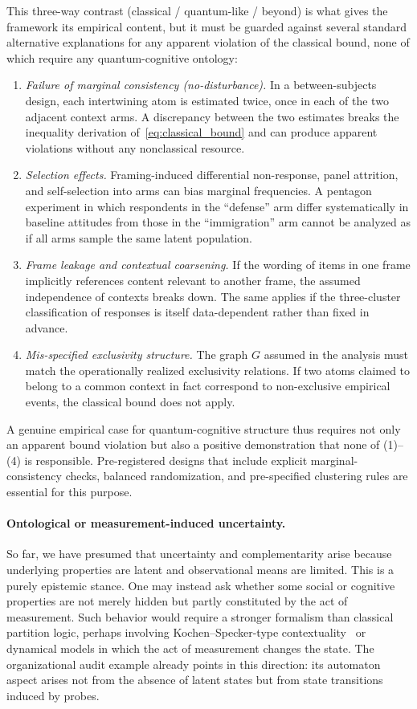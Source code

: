 \documentclass[aps,pra,twocolumn,superscriptaddress,floatfix,longbibliography]{revtex4-2}
\begin{document}
This three-way contrast (classical / quantum-like / beyond) is what
gives the framework its empirical content, but it must be guarded
against several standard alternative explanations for any apparent
violation of the classical bound, none of which require any
quantum-cognitive ontology:
\begin{enumerate}
\item \emph{Failure of marginal consistency (no-disturbance).}
In a between-subjects design, each intertwining atom is estimated
twice, once in each of the two adjacent context arms. A discrepancy
between the two estimates breaks the inequality derivation
of~\eqref{eq:classical_bound} and can produce apparent violations
without any nonclassical resource.
\item \emph{Selection effects.}
Framing-induced differential non-response, panel attrition, and
self-selection into arms can bias marginal frequencies. A pentagon
experiment in which respondents in the ``defense'' arm differ
systematically in baseline attitudes from those in the
``immigration'' arm cannot be analyzed as if all arms sample the
same latent population.
\item \emph{Frame leakage and contextual coarsening.}
If the wording of items in one frame implicitly references content
relevant to another frame, the assumed independence of contexts
breaks down. The same applies if the three-cluster classification of
responses is itself data-dependent rather than fixed in advance.
\item \emph{Mis-specified exclusivity structure.}
The graph $G$ assumed in the analysis must match the operationally
realized exclusivity relations. If two atoms claimed to belong to a
common context in fact correspond to non-exclusive empirical
events, the classical bound does not apply.
\end{enumerate}
A genuine empirical case for quantum-cognitive structure thus
requires not only an apparent bound violation but also a positive
demonstration that none of (1)--(4) is responsible. Pre-registered
designs that include explicit marginal-consistency checks, balanced
randomization, and pre-specified clustering rules are essential for
this purpose.

\paragraph{Ontological or measurement-induced uncertainty.}
So far, we have presumed that uncertainty and complementarity arise
because underlying properties are latent and observational means are
limited. This is a purely epistemic stance. One may instead ask
whether some social or cognitive properties are not merely hidden but
partly constituted by the act of measurement. Such behavior would
require a stronger formalism than classical partition logic, perhaps
involving Kochen--Specker-type contextuality~\cite{kochen1} or
dynamical models in which the act of measurement changes the state.
The organizational audit example already points in this direction:
its automaton aspect arises not from the absence of latent states but
from state transitions induced by probes.
\end{document}
